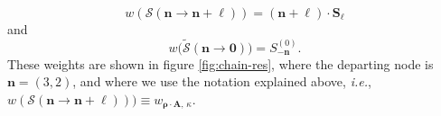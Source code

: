 \documentclass[11pt,a4paper]{article}
\newcommand{\be}{\begin{equation}}
\newcommand{\ee}{\end{equation}}
\begin{document}
%
\be
\label{eq:ell-res-weights}
w \left( \mathcal{S} \left( \boldsymbol{n} \rightarrow \boldsymbol{n} + \boldsymbol{\ell} \right) \right) = \left( \boldsymbol{n} + \boldsymbol{\ell} \right) \cdot \boldsymbol{S}_{\boldsymbol{\ell}}
\ee
%
\noindent
and
%
\be
\label{eq:ell-res-weightstilde}
w \big( \widetilde{\mathcal{S}} \left( \boldsymbol{n} \rightarrow \boldsymbol{0} \right) \big) = S^{(0)}_{-\boldsymbol{n}}.
\ee
%
\noindent
These weights are shown in figure \ref{fig:chain-res}, where the departing node is $\boldsymbol{n} = (3,2)$, and where we use the notation explained above, \textit{i.e.}, $w \left( \mathcal{S} \left( \boldsymbol{n} \rightarrow \boldsymbol{n} + \boldsymbol{\ell} \right) \right)) \equiv w_{\boldsymbol{\rho} \cdot \boldsymbol{A},\, \kappa}$.

\end{document}
